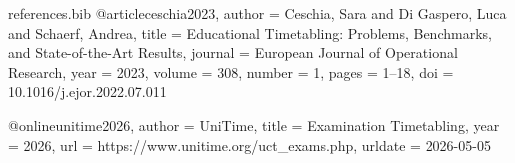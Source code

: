 \begin{filecontents*}{references.bib}
@article{ceschia2023,
  author = {Ceschia, Sara and Di Gaspero, Luca and Schaerf, Andrea},
  title = {Educational Timetabling: Problems, Benchmarks, and State-of-the-Art Results},
  journal = {European Journal of Operational Research},
  year = {2023},
  volume = {308},
  number = {1},
  pages = {1--18},
  doi = {10.1016/j.ejor.2022.07.011}
}

@online{unitime2026,
  author = {{UniTime}},
  title = {Examination Timetabling},
  year = {2026},
  url = {https://www.unitime.org/uct_exams.php},
  urldate = {2026-05-05}
}
\end{filecontents*}


\documentclass[11pt, a4paper]{article}

\usepackage[T1]{fontenc}
\usepackage[utf8]{inputenc}
\usepackage{mathptmx}
\usepackage[top=2cm, bottom=1.5cm, left=1.5cm, right=1.5cm]{geometry}
\usepackage{setspace}
\usepackage{titlesec}
\usepackage{titletoc}
\usepackage{fancyhdr}
\usepackage{graphicx}
\usepackage{float}
\usepackage{booktabs}
\usepackage{array}
\usepackage{tabularx}
\usepackage{multirow}
\usepackage{amsmath, amssymb}
\usepackage{algorithm}
\usepackage{algpseudocode}
\usepackage{hyperref}
\usepackage{xcolor}
\usepackage{caption}
\usepackage{subcaption}
\usepackage{enumitem}
\usepackage{microtype}
\usepackage[backend=biber, style=apa, sorting=nyt]{biblatex}


\hypersetup{colorlinks=true, linkcolor=black, citecolor=black, urlcolor=black}

\titleformat{\section}{\large\bfseries}{}{0em}{}[\titlerule]
\titleformat{\subsubsection}{\normalsize\itshape}{}{0em}{}


